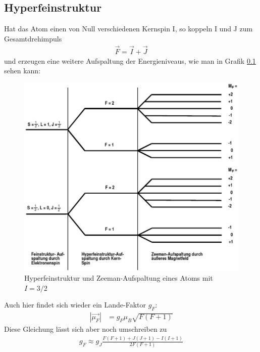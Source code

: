 \subsection{Hyperfeinstruktur}
Hat das Atom einen von Null verschiedenen Kernspin I, so koppeln I und J zum Gesamtdrehimpuls
\begin{align*}
\vec{F}=\vec{I}+\vec{J}
\end{align*}
und erzeugen eine weitere Aufspaltung der Energieniveaus, wie man in Grafik \ref{} sehen kann:
\begin{figure}[h]
\includegraphics[scale=1]{../pics/zeehyper.pdf}
\caption{Hyperfeinstruktur und Zeeman-Aufspaltung eines Atoms mit $I=3/2$}
\end{figure}
Auch hier findet sich wieder ein Lande-Faktor $g_F$:
\begin{align*}
|\vec{\mu_F}|&=g_F \mu_B \sqrt{F(F+1)}
\end{align*}
Diese Gleichung lässt sich aber noch umschreiben zu
\begin{align}
g_F\approx g_J \frac{F(F+1)+J(J+1)-I(I+1)}{2F(F+1)}
\end{align}

